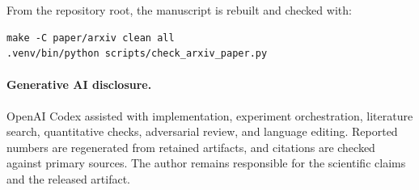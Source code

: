 From the repository root, the manuscript is rebuilt and checked with:

\begin{verbatim}
make -C paper/arxiv clean all
.venv/bin/python scripts/check_arxiv_paper.py
\end{verbatim}

\paragraph{Generative AI disclosure.}
OpenAI Codex assisted with implementation, experiment orchestration, literature
search, quantitative checks, adversarial review, and language editing. Reported
numbers are regenerated from retained artifacts, and citations are checked
against primary sources. The author remains responsible for the scientific
claims and the released artifact.
